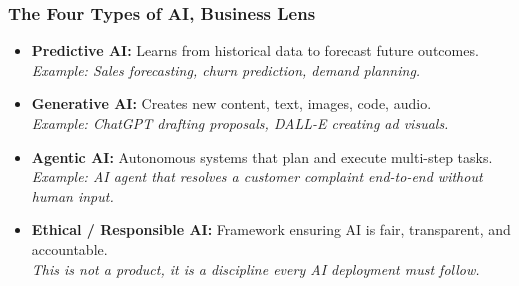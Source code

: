 \begin{frame}[fragile]\frametitle{The Four Types of AI, Business Lens}

    \begin{itemize}
      \item \textbf{Predictive AI:} Learns from historical data to forecast future outcomes.\\
        \textit{Example: Sales forecasting, churn prediction, demand planning.}
      \item \textbf{Generative AI:} Creates new content, text, images, code, audio.\\
        \textit{Example: ChatGPT drafting proposals, DALL-E creating ad visuals.}
      \item \textbf{Agentic AI:} Autonomous systems that plan and execute multi-step tasks.\\
        \textit{Example: AI agent that resolves a customer complaint end-to-end without human input.}
      \item \textbf{Ethical / Responsible AI:} Framework ensuring AI is fair, transparent, and accountable.\\
        \textit{This is not a product, it is a discipline every AI deployment must follow.}
    \end{itemize}

\end{frame}


 


